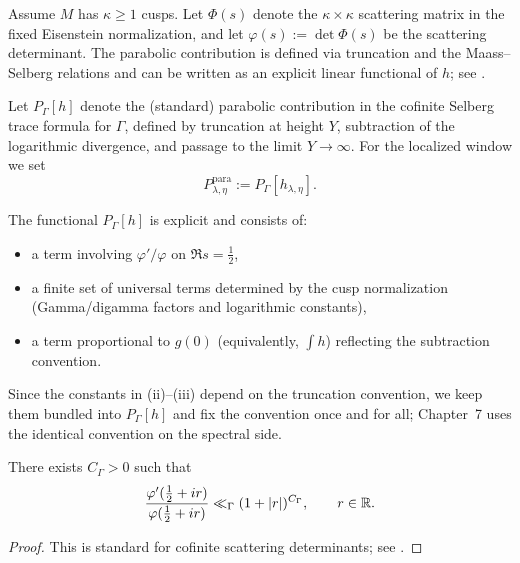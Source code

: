 Assume $M$ has $\kappa\ge 1$ cusps. Let $\Phi(s)$ denote the $\kappa\times\kappa$ scattering matrix in the fixed
Eisenstein normalization, and let $\varphi(s):=\det\Phi(s)$ be the scattering determinant.
The parabolic contribution is defined via truncation and the Maass--Selberg relations and can be written as an explicit
linear functional of $h$; see \cite{Hejhal1983,Iwaniec2002}.

\begin{definition}\label{def:6.parabolic.functional}
Let $P_\Gamma[h]$ denote the (standard) parabolic contribution in the cofinite Selberg trace formula for $\Gamma$,
defined by truncation at height $Y$, subtraction of the logarithmic divergence, and passage to the limit $Y\to\infty$.
For the localized window we set
\begin{equation}\label{eq:6.parabolic.def}
P_{\lambda,\eta}^{\mathrm{para}}:=P_\Gamma[h_{\lambda,\eta}].
\end{equation}
\end{definition}

\begin{remark}\label{rem:6.parabolic.structure}
The functional $P_\Gamma[h]$ is explicit and consists of:
\begin{itemize}
\item[(i)] a term involving $\varphi'/\varphi$ on $\Re s=\tfrac12$,
\item[(ii)] a finite set of universal terms determined by the cusp normalization (Gamma/digamma factors and logarithmic constants),
\item[(iii)] a term proportional to $g(0)$ (equivalently, $\int h$) reflecting the subtraction convention.
\end{itemize}
Since the constants in (ii)--(iii) depend on the truncation convention, we keep them bundled into $P_\Gamma[h]$ and
fix the convention once and for all; Chapter~7 uses the identical convention on the spectral side.
\end{remark}

\begin{lemma}\label{lem:6.scattering.growth}
There exists $C_\Gamma>0$ such that
\[
\frac{\varphi'(\tfrac12+ir)}{\varphi(\tfrac12+ir)}\ll_\Gamma (1+|r|)^{C_\Gamma},
\qquad r\in\mathbb{R}.
\]
\end{lemma}

\begin{proof}
This is standard for cofinite scattering determinants; see \cite{Hejhal1983,Iwaniec2002}.
\end{proof}

